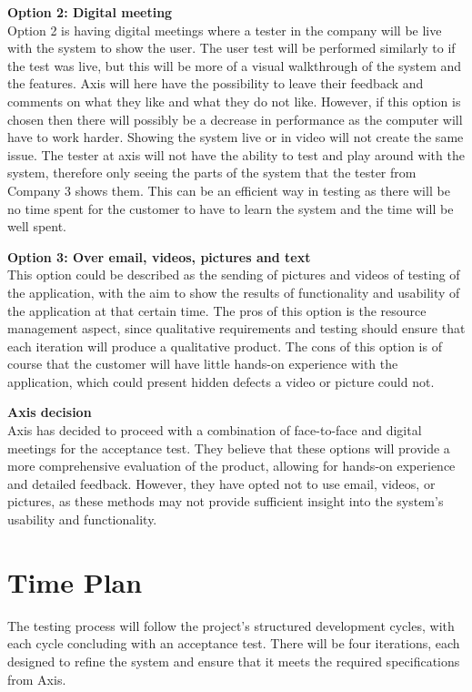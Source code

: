 \documentclass{article}
\begin{document}
\textbf{Option 2: Digital meeting}\\
Option 2 is having digital meetings where a tester in the company will be live with the system to show the user. The user test will be performed similarly to if the test was live, but this will be more of a visual walkthrough of the system and the features. Axis will here have the possibility to leave their feedback and comments on what they like and what they do not like. However, if this option is chosen then there will possibly be a decrease in performance as the computer will have to work harder. Showing the system live or in video will not create the same issue. The tester at axis will not have the ability to test and play around with the system, therefore only seeing the parts of the system that the tester from Company 3 shows them. This can be an efficient way in testing as there will be no time spent for the customer to have to learn the system and the time will be well spent. 

\textbf{Option 3: Over email, videos, pictures and text}\\
This option could be described as the sending of pictures and videos of testing of the application, with the aim to show the results of functionality and usability of the application at that certain time. The pros of this option is the resource management aspect, since qualitative requirements and testing should ensure that each iteration will produce a qualitative product. The cons of this option is of course that the customer will have little hands-on experience with the application, which could present hidden defects a video or picture could not. 

\textbf{Axis decision} \\
Axis has decided to proceed with a combination of face-to-face and digital meetings for the acceptance test. They believe that these options will provide a more comprehensive evaluation of the product, allowing for hands-on experience and detailed feedback. However, they have opted not to use email, videos, or pictures, as these methods may not provide sufficient insight into the system’s usability and functionality.


\section{Time Plan}

The testing process will follow the project’s structured development cycles, with each cycle concluding with an acceptance test. There will be four iterations, each designed to refine the system and ensure that it meets the required specifications from Axis. 
\end{document}
